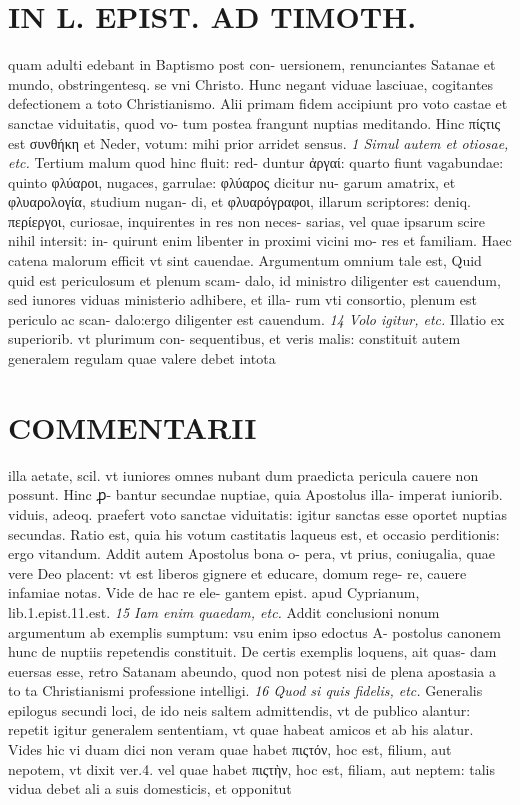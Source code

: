 \documentclass{article}
\begin{document}
\begin{pages}
\section*{IN L. EPIST. AD TIMOTH. }
\marginpar{[ p.129 ]}\pstart quam adulti edebant in Baptismo post con- uersionem, renunciantes Satanae et mundo, obstringentesq. se vni Christo. Hunc negant viduae lasciuae, cogitantes defectionem a toto Christianismo. Alii primam fidem accipiunt pro voto castae et sanctae viduitatis, quod vo- tum postea frangunt nuptias meditando. Hinc πίςτις est συνθήκη et Neder, votum: mihi prior arridet sensus.  \pend
\textit{1 Simul autem et otiosae, etc. }\pstart Tertium malum quod hinc fluit: red- duntur ἀργαί: quarto fiunt vagabundae: quinto φλύαροι, nugaces, garrulae: φλύαρος dicitur nu- garum amatrix, et φλυαρολογία, studium nugan- di, et φλυαρόγραφοι, illarum scriptores: deniq. περίεργοι, curiosae, inquirentes in res non neces- sarias, vel quae ipsarum scire nihil intersit: in- quirunt enim libenter in proximi vicini mo- res et familiam. Haec catena malorum efficit vt sint cauendae. Argumentum omnium tale est, Quid quid est periculosum et plenum scam- dalo, id ministro diligenter est cauendum, sed iunores viduas ministerio adhibere, et illa- rum vti consortio, plenum est periculo ac scan- dalo:ergo diligenter est cauendum.  \pend
\textit{14 Volo igitur, etc. }\pstart Illatio ex superiorib. vt plurimum con- sequentibus, et veris malis: constituit autem generalem regulam quae valere debet intota  \pend
\section*{COMMENTARII }
\marginpar{[ p.130 ]}\pstart illa aetate, scil. vt iuniores omnes nubant dum praedicta pericula cauere non possunt. Hinc ꝓ- bantur secundae nuptiae, quia Apostolus illa- imperat iuniorib. viduis, adeoq. praefert voto sanctae viduitatis: igitur sanctas esse oportet nuptias secundas. Ratio est, quia his votum castitatis laqueus est, et occasio perditionis: ergo vitandum. Addit autem Apostolus bona o- pera, vt prius, coniugalia, quae vere Deo placent: vt est liberos gignere et educare, domum rege- re, cauere infamiae notas. Vide de hac re ele- gantem epist. apud Cyprianum, lib.1.epist.11.est.  \pend
\textit{15 Iam enim quaedam, etc. }\pstart Addit conclusioni nonum argumentum ab exemplis sumptum: vsu enim ipso edoctus A- postolus canonem hunc de nuptiis repetendis constituit. De certis exemplis loquens, ait quas- dam euersas esse, retro Satanam abeundo, quod non potest nisi de plena apostasia a to ta Christianismi professione intelligi.  \pend
\textit{16 Quod si quis fidelis, etc. }\pstart Generalis epilogus secundi loci, de ido neis saltem admittendis, vt de publico alantur: repetit igitur generalem sententiam, vt quae habeat amicos et ab his alatur. Vides hic vi duam dici non veram quae habet πιςτόν, hoc est, filium, aut nepotem, vt dixit ver.4. vel quae habet πιςτὴν, hoc est, filiam, aut neptem: talis vidua debet ali a suis domesticis, et opponitut  \pend

\end{pages}
\end{document}
